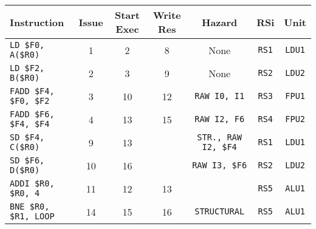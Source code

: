 \begin{enumerate}
    \begin{table}[!htp]
        \centering
        \begin{adjustbox}{width={\textwidth},totalheight={\textheight},keepaspectratio}
        \begin{tabular}{@{} l c c c c c c @{}}
            \toprule
            \textbf{Instruction} & \textbf{Issue} & \textbf{Start Exec} & \textbf{Write Res} & \textbf{Hazard} & \textbf{RSi} & \textbf{Unit} \\
            \midrule
            \texttt{LD \$F0, A(\$R0)}       & 1 & 2 & 8 & None  & \texttt{RS1}   & \texttt{LDU1}  \\ [.5em]
            \texttt{LD \$F2, B(\$R0)}       & 2 & 3 & 9 & None  & \texttt{RS2}   & \texttt{LDU2}  \\ [.5em]
            \texttt{FADD \$F4, \$F0, \$F2}  & 3 & 10 & 12 & \texttt{RAW I0, I1} & \texttt{RS3} & \texttt{FPU1} \\ [.5em]
            \texttt{FADD \$F6, \$F4, \$F4}  & 4 & 13 & 15 & \texttt{RAW I2, F6} & \texttt{RS4} & \texttt{FPU2} \\ [.5em]
            \texttt{SD \$F4, C(\$R0)}       & 9 & 13 &   & \texttt{STR., RAW I2, \$F4} & \texttt{RS1} & \texttt{LDU1} \\ [.5em]
            \texttt{SD \$F6, D(\$R0)}       & 10 & 16 &   & \texttt{RAW I3, \$F6} & \texttt{RS2} & \texttt{LDU2} \\ [.5em]
            \texttt{ADDI \$R0, \$R0, 4}     & 11 & 12 & 13 &       & \texttt{RS5} & \texttt{ALU1} \\ [.5em]
            \texttt{BNE \$R0, \$R1, LOOP}   & 14 & 15 & 16 & \texttt{STRUCTURAL} & \texttt{RS5} & \texttt{ALU1} \\
            \bottomrule
        \end{tabular}
        \end{adjustbox}
    \end{table}
    

\end{enumerate}
